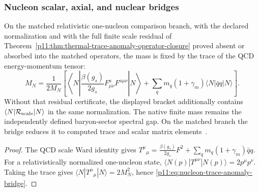 \documentclass[12pt,a4paper]{article}
\begin{document}
\subsubsection{Nucleon scalar, axial, and nuclear bridges}
\label{p11:subsec:nucleon-scalar-axial-nuclear-bridges}

\begin{theorem}
\label{p11:thm:nucleon-trace-anomaly-bridge}
On the matched relativistic one-nucleon comparison branch, with the
declared normalization and with the full finite scale residual of
Theorem~\ref{p11:thm:thermal-trace-anomaly-operator-closure} proved absent
or absorbed into the matched operators, the mass is fixed by the trace of
the QCD energy-momentum tensor:
\begin{equation}
\label{p11:eq:nucleon-trace-anomaly-bridge}
M_N=\frac1{2M_N}\left[
\left\langle N\left|\frac{\beta(g_s)}{2g_s}F_{\mu\nu}^aF^{a\mu\nu}\right|N\right\rangle
+\sum_q m_q(1+\gamma_m)\langle N|\bar q q|N\rangle
\right].
\end{equation}
Without that residual certificate, the displayed bracket additionally
contains $\langle N|\mathcal R_{\rm scale}|N\rangle$ in the same
normalization. The native finite mass remains the independently defined
baryon-sector spectral gap. On the matched branch the bridge reduces it to
computed trace and scalar matrix elements~\cite{CollinsDuncanJoglekar1977,ShifmanVainshteinZakharov1978}.
\end{theorem}
\begin{proof}
The QCD scale Ward identity gives \(T^\mu{}_{\mu}=\frac{\beta(g_s)}{2g_s}F^2+\sum_qm_q(1+\gamma_m)\bar q q\).  For a relativistically normalized one-nucleon state, \(\langle N(p)|T^{\mu\nu}|N(p)\rangle=2p^\mu p^\nu\).  Taking the trace gives \(\langle N|T^\mu{}_{\mu}|N\rangle=2M_N^2\), hence \eqref{p11:eq:nucleon-trace-anomaly-bridge}.\qedhere
\end{proof}
\end{document}
